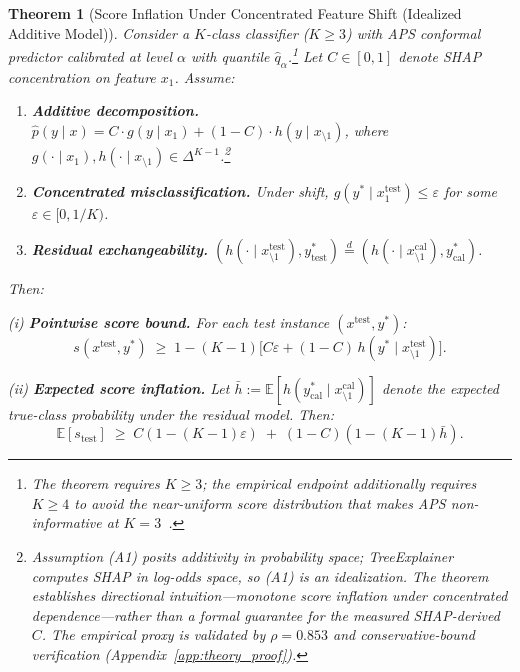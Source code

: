 \documentclass{uai2026} %
\newtheorem{theorem}{Theorem}
\begin{document}
\begin{theorem}[Score Inflation Under Concentrated Feature Shift (Idealized Additive Model)]\label{thm:score_inflation}
Consider a $K$-class classifier ($K \geq 3$) with APS conformal predictor calibrated at level $\alpha$ with quantile $\hat{q}_\alpha$.\footnote{The theorem requires $K \geq 3$; the empirical endpoint additionally requires $K \geq 4$ to avoid the near-uniform score distribution that makes APS non-informative at $K=3$~\citep{ding2023class}.} Let $C \in [0,1]$ denote SHAP concentration on feature $x_1$. Assume:
\begin{enumerate}[label=\textup{(A\arabic*)},leftmargin=*,nosep]
\item \textbf{Additive decomposition.} $\hat{p}(y \mid x) = C \cdot g(y \mid x_1) + (1-C) \cdot h(y \mid x_{\setminus 1})$, where $g(\cdot \mid x_1), h(\cdot \mid x_{\setminus 1}) \in \Delta^{K-1}$.\footnote{Assumption (A1) posits additivity in \emph{probability} space; TreeExplainer computes SHAP in \emph{log-odds} space, so (A1) is an idealization. The theorem establishes directional intuition---monotone score inflation under concentrated dependence---rather than a formal guarantee for the measured SHAP-derived $C$. The empirical proxy is validated by $\rho=0.853$ and conservative-bound verification (Appendix~\ref{app:theory_proof}).}
\item \textbf{Concentrated misclassification.} Under shift, $g(y^* \mid x_1^{\mathrm{test}}) \leq \varepsilon$ for some $\varepsilon \in [0, 1/K)$.
\item \textbf{Residual exchangeability.} $(h(\cdot \mid x_{\setminus 1}^{\mathrm{test}}), y^*_{\mathrm{test}}) \stackrel{d}{=} (h(\cdot \mid x_{\setminus 1}^{\mathrm{cal}}), y^*_{\mathrm{cal}})$.
\end{enumerate}
Then:

\smallskip
\noindent\textup{(i)} \textbf{Pointwise score bound.} For each test instance $(x^{\mathrm{test}}, y^*)$:
\begin{equation}\label{eq:score_pointwise}
s(x^{\mathrm{test}}, y^*) \;\geq\; 1 - (K\!-\!1)\big[C\varepsilon + (1\!-\!C)\,h(y^*\!\mid\! x_{\setminus 1}^{\mathrm{test}})\big].
\end{equation}

\smallskip
\noindent\textup{(ii)} \textbf{Expected score inflation.} Let $\bar{h} := \mathbb{E}[h(y^*_{\mathrm{cal}} \mid x_{\setminus 1}^{\mathrm{cal}})]$ denote the expected true-class probability under the residual model. Then:
\begin{equation}\label{eq:score_bound}
\mathbb{E}[s_{\mathrm{test}}] \;\geq\; C(1\!-\!(K\!-\!1)\varepsilon) \;+\; (1\!-\!C)(1\!-\!(K\!-\!1)\bar{h}).
\end{equation}


\end{theorem}
\end{document}
